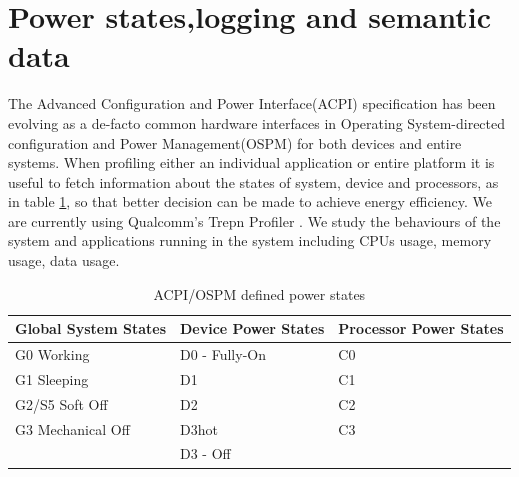 \section{Power states,logging and semantic data}
The Advanced Configuration and Power Interface(ACPI) specification has been evolving as a de-facto common hardware interfaces in Operating System-directed configuration and  Power Management(OSPM) for both devices and entire systems. When profiling either an individual application or entire platform it is useful to fetch information about the states of system, device and processors, as in table \ref{table:states}, so that better decision can be made to achieve energy efficiency. We are currently using Qualcomm's Trepn Profiler \cite{trepn}. We study the behaviours of the system and applications running in the system including CPUs usage, memory usage, data usage. 
\begin{table}[h]
\begin{tabular}{|l|l|l|}
\hline
Global System States & Device Power States  & Processor Power States \\
\hline
G0 Working & D0 - Fully-On  & C0\\
G1 Sleeping & D1  & C1\\
G2/S5 Soft Off & D2 & C2\\
G3 Mechanical Off & D3hot & C3\\
& D3 - Off & \\
\hline
\end{tabular}
\caption{ACPI/OSPM defined power states}
\label{table:states}
\end{table}

